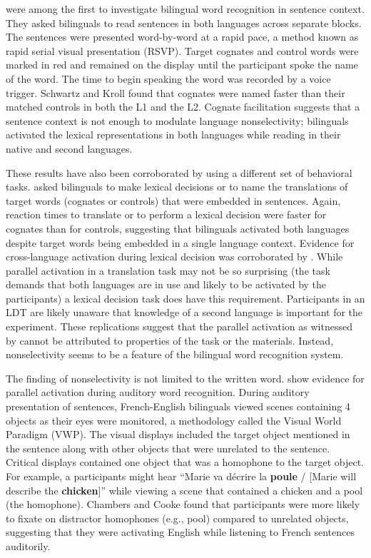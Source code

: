 \textcite{Schwartz2006} were among the first to investigate bilingual word recognition in sentence context. They asked bilinguals to read sentences in both languages  across separate blocks. The sentences were presented word-by-word at a rapid pace, a method known as rapid serial visual presentation (RSVP). Target cognates and control words were marked in red and remained on the display until the participant spoke the name of the word. The time to begin speaking the word was recorded by a voice trigger. Schwartz and Kroll found that cognates were named faster than their matched controls in both the L1 and the L2. Cognate facilitation suggests that a sentence context is not enough to modulate language nonselectivity; bilinguals activated the lexical representations in both languages while reading in their native and second languages.

These results have also been corroborated by using a different set of behavioral tasks. \textcite{VanHell2008} asked bilinguals to make lexical decisions or to name the translations of target words (cognates or controls) that were embedded in sentences. Again, reaction times to translate or to perform a lexical decision were faster for cognates than for controls, suggesting that bilinguals activated both languages despite target words being embedded in a single language context. Evidence for cross-language activation during  lexical decision was corroborated by \textcite{Baten2010}. While parallel activation in a translation task may not be so surprising (the task demands that both languages are in use and likely to be activated by the participants) a lexical decision task does have this requirement.  Participants in an LDT are likely unaware that knowledge of a second language is important for the experiment. These replications suggest that the parallel activation as witnessed by \textcite{Schwartz2006} cannot be attributed to properties of the task or the materials. Instead, nonselectivity  seems to be a feature of the bilingual word recognition system. 

The finding of nonselectivity is not limited to the written word. \textcite{Chambers2009} show evidence for parallel activation during auditory word recognition. During auditory presentation of  sentences, French-English bilinguals viewed scenes containing 4 objects as their eyes were monitored, a methodology called the Visual World Paradigm (VWP). The visual displays included the target object mentioned in the sentence along with other objects that were unrelated to the sentence. Critical displays contained one object that was a homophone to the target object. For example, a participants might hear ``Marie va d\'{e}crire la \textbf{poule} / [Marie will describe the \textbf{chicken}]'' while viewing a scene that contained a chicken and a pool (the homophone). Chambers and Cooke found that participants were more likely to fixate on distractor homophones (e.g., pool) compared to unrelated objects, suggesting that they were activating English while listening to French sentences auditorily. 

